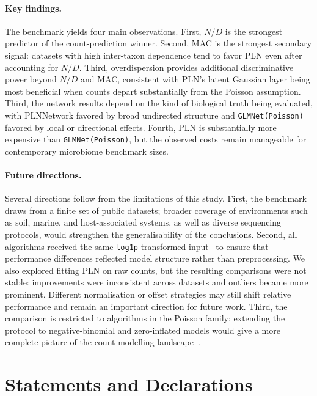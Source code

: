 \documentclass[Review,doublespace,sageh,times]{sagej}
\begin{document}
\paragraph{Key findings.}
The benchmark yields four main observations.
First, $N/D$ is the strongest predictor of the count-prediction winner.
Second, MAC is the strongest secondary signal: datasets with high inter-taxon dependence tend to favor PLN even after accounting for $N/D$.
Third, overdispersion provides additional discriminative power beyond $N/D$ and MAC, consistent with PLN's latent Gaussian layer being most beneficial when counts depart substantially from the Poisson assumption.
Third, the network results depend on the kind of biological truth being evaluated, with PLNNetwork favored by broad undirected structure and \texttt{GLMNet(Poisson)} favored by local or directional effects.
Fourth, PLN is substantially more expensive than \texttt{GLMNet(Poisson)}, but the observed costs remain manageable for contemporary microbiome benchmark sizes.

\paragraph{Future directions.}
Several directions follow from the limitations of this study.
First, the benchmark draws from a finite set of public datasets; broader coverage of environments such as soil, marine, and host-associated systems, as well as diverse sequencing protocols, would strengthen the generalisability of the conclusions.
Second, all algorithms received the same \texttt{log1p}-transformed input~\citep{doi:10.1128/mSystems.00016-19} to ensure that performance differences reflected model structure rather than preprocessing.
We also explored fitting PLN on raw counts, but the resulting comparisons were not stable: improvements were inconsistent across datasets and outliers became more prominent.
Different normalisation or offset strategies may still shift relative performance and remain an important direction for future work.
Third, the comparison is restricted to algorithms in the Poisson family; extending the protocol to negative-binomial and zero-inflated models would give a more complete picture of the count-modelling landscape~\citep{10.1038/s41598-024-76513-8,10.1101/538579,10.1093/bioadv/vbae167,Champion2024OneNet}.

\section*{Statements and Declarations}
\end{document}
